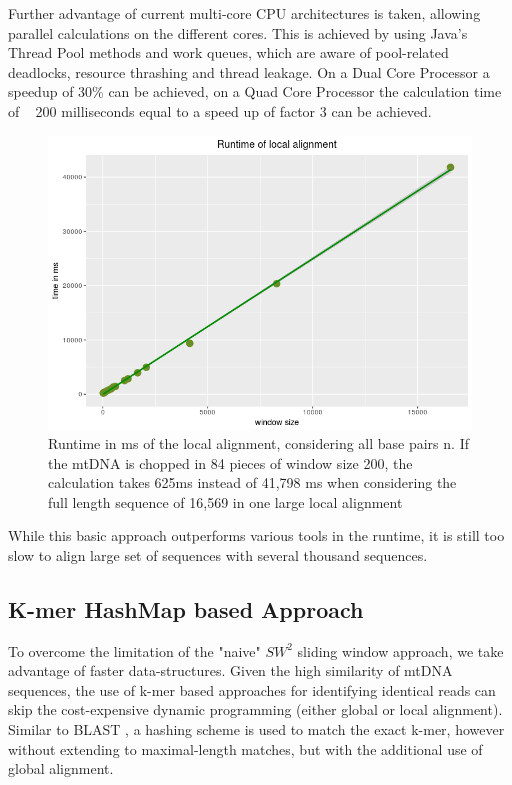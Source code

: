 Further advantage of current multi-core CPU architectures is taken, allowing parallel calculations on the different cores. This is achieved by using Java’s Thread Pool methods and work queues, which are aware of pool-related deadlocks, resource thrashing and thread leakage. On a Dual Core Processor a speedup of 30\% can be achieved, on a Quad Core Processor the calculation time of ~ 200 milliseconds equal to a speed up of factor 3 can be achieved.
\begin{figure}[!ht]

    \centering
    \includegraphics[width=1\textwidth]{images/fig4_8.png}
    \caption[Runtime in ms of Gotoh for n/i ]{Runtime in ms of the local alignment, considering all base pairs n. If the mtDNA is chopped in 84 pieces of window size 200, the calculation takes 625ms instead of 41,798 ms when considering the full length sequence of 16,569 in one large local alignment} 
    \label{fig:runtimeSW}    
\end{figure}
While this basic approach outperforms various tools in the runtime, it is still too slow to align large set of sequences with several thousand sequences. 

\subsection{K-mer HashMap based Approach}
To overcome the limitation of the "naive" $SW^{2}$ sliding window approach, we take advantage of faster data-structures. Given the high similarity of mtDNA sequences, the use of k-mer based approaches for identifying identical reads can skip the cost-expensive dynamic programming (either global or local alignment). Similar to BLAST \cite{Altschul1990}, a hashing scheme is used to match the exact k-mer, however without extending to maximal-length matches, but with the additional use of global alignment. 

